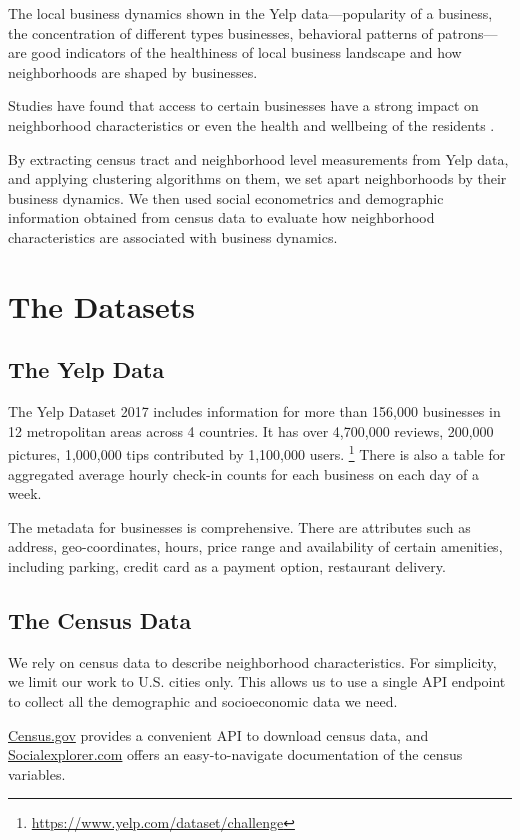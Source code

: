 \documentclass[compsoc]{IEEEtran}
\begin{document}
The local business dynamics shown in the Yelp data---popularity of a business, the concentration of different types businesses, behavioral patterns of patrons---are good indicators of the healthiness of local business landscape and how neighborhoods are shaped by businesses.

Studies have found that access to certain businesses have a strong impact on neighborhood characteristics or even the health and wellbeing of the residents \cite{morland2002neighborhood}.

By extracting census tract and neighborhood level measurements from Yelp data, and applying clustering algorithms on them, we set apart neighborhoods by their business dynamics. We then used social econometrics and demographic information obtained from census data to evaluate how neighborhood characteristics are associated with business dynamics.


\section{The Datasets}

\subsection{The Yelp Data}

The Yelp Dataset 2017 includes information for more than 156,000 businesses in 12 metropolitan areas across 4 countries. It has over 4,700,000 reviews, 200,000 pictures, 1,000,000 tips contributed by 1,100,000 users. \footnote{\url{https://www.yelp.com/dataset/challenge}} There is also a table for aggregated average hourly check-in counts for each business on each day of a week.

The metadata for businesses is comprehensive. There are attributes such as address, geo-coordinates, hours, price range and availability of certain amenities, including parking, credit card as a payment option, restaurant delivery.

\subsection{The Census Data}

We rely on census data to describe neighborhood characteristics. For simplicity, we limit our work to U.S. cities only. This allows us to use a single API endpoint to collect all the demographic and socioeconomic data we need.

 \url{Census.gov} provides a convenient API to download census data, and \url{Socialexplorer.com} offers an easy-to-navigate documentation of the census variables.
 
\end{document}
